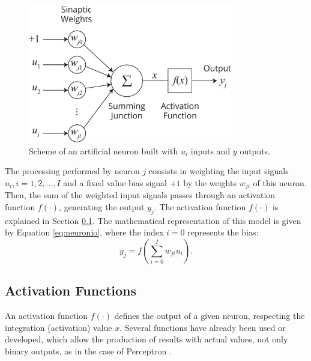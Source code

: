 \begin{figure}[h!]
	\caption{Scheme of an artificial neuron built with $u_i$ inputs and $y$ outputs.}
	\vspace{0.2cm}
	\begin{center}
		\includegraphics[width=0.8\textwidth]{"Part 3 - Learning Systems/Supervised Learning/Multilayer Perceptron/neuronioArtificial.png"}
	\end{center}
	\label{fig:neuronio}
\end{figure}

The processing performed by neuron $j$ consists in weighting the input signals $u_i , i=1, 2,..., I$ and a fixed value bias signal $+1$ by the weights $w_{ji}$ of this neuron. Then, the sum of the weighted input signals passes through an activation function $f(\cdot)$, generating the output $y_j$. The activation function $f(\cdot)$ is explained in Section \ref{ssec:ativacao}. The mathematical representation of this model is given by Equation \ref{eq:neuronio}, where the index $i=0$ represents the bias:
\begin{equation}
    \label{eq:neuronio}
    y_j = f \left( \sum_{i=0}^I w_{ji} u_i  \right).
\end{equation}

\subsection{Activation Functions}
\label{ssec:ativacao}

An activation function $f(\cdot)$ defines the output of a given neuron, respecting the integration (activation) value $x$. Several functions have already been used or developed, which allow the production of results with actual values, not only binary outputs, as in the case of Perceptron \cite{haykin}.

